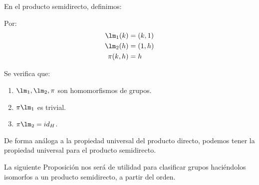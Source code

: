 
\begin{definicion}
    En el producto semidirecto, definimos:
    \begin{figure}[H]
        \centering
    \end{figure}
    Por:
    \begin{align*}
        \lm_1(k) &= (k,1)  \\
        \lm_2(h) &= (1,h)  \\
        \pi(k,h) &= h
    \end{align*}
\end{definicion}

\begin{prop}
    Se verifica que:
    \begin{enumerate}
        \item $\lm_1, \lm_2, \pi$ son homomorfismos de grupos.
        \item $\pi \lm_1$ es trivial.
        \item $\pi\lm_2 = id_H$.
    \end{enumerate}
\end{prop}

\noindent
De forma análoga a la propiedad universal del producto directo, podemos tener la propiedad universal para el producto semidirecto.

\noindent
La siguiente Proposición nos será de utilidad para clasificar grupos haciéndolos isomorfos a un producto semidirecto, a partir del orden.

